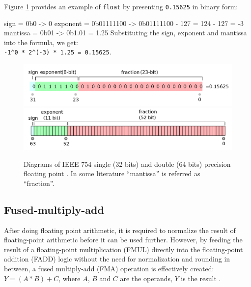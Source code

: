\documentclass[logo,bsc,singlespacing,parskip]{infthesis}
\newcommand{\dtfloat}{\texttt{float}}
\newenvironment{VerbatimCompact}
  {\vspace*{-2.5mm}\VerbatimEnvironment
   \par\Verbatim}
  {\endVerbatim\vspace*{-2.4mm}}
\begin{document}
Figure \ref{fig:ieee-f32} provides an example of \dtfloat{} by presenting
\texttt{0.15625} in binary form:
\begin{VerbatimCompact}
sign     = 0b0        -> 0
exponent = 0b01111100 -> 0b01111100 - 127 = 124 - 127 = -3
mantissa = 0b01       -> 0b1.01 = 1.25
\end{VerbatimCompact}
Substituting the sign, exponent and mantissa into the formula, we get: \\
\texttt{-1\^{}0 * 2\^{}(-3) * 1.25 = 0.15625}.



\begin{figure}
    \begin{center}
        \captionsetup{justification=centering}
        \includegraphics[width=\linewidth]{image/ieee-f32.png}
        \includegraphics[width=\linewidth]{image/ieee-f64.png}
        \caption{Diagrams of IEEE 754 single (32 bits) and double (64 bits)
        precision floating point \cite{ieee754-diagram}. In some literature
        ``mantissa'' is referred as ``fraction''.}
        \label{fig:ieee-f32}
    \end{center}
\end{figure}

\subsection{Fused-multiply-add}
\label{sec:FMA}

After doing floating point arithmetic, it is required to normalize the result of
floating-point arithmetic before it can be used further. However, by feeding the
result of a floating-point multiplication (FMUL) directly into the
floating-point addition (FADD) logic without the need for normalization and
rounding in between, a fused multiply-add (FMA) operation is effectively
created: 
\begin{math}Y = (A * B) + C \end{math}, where 
\begin{math}A\end{math},
\begin{math}B\end{math} and
\begin{math}C\end{math} are the operands, 
 \begin{math}Y\end{math} is the result \cite{CARD}.
\end{document}
